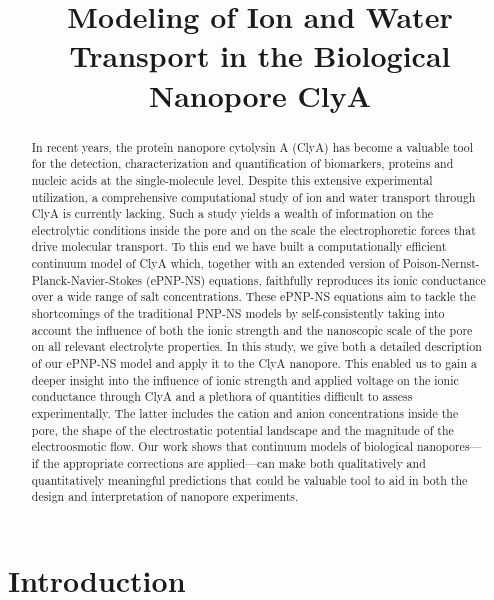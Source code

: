 \documentclass[journal=ancac3,manuscript=article,etalmode=truncate,maxauthors=0,layout=onecolumn]{achemso}
\title{Modeling of Ion and Water Transport in the Biological Nanopore ClyA}
\begin{document}
\begin{tocentry}
\end{tocentry}



\begin{abstract}
  \footnotesize
  In recent years, the protein nanopore cytolysin A (ClyA) has become a valuable tool for the detection,
  characterization and quantification of biomarkers, proteins and nucleic acids at the single-molecule level.
  Despite this extensive experimental utilization, a comprehensive computational study of ion and water
  transport through ClyA is currently lacking. Such a study yields a wealth of information on the electrolytic
  conditions inside the pore and on the scale the electrophoretic forces that drive molecular transport. To
  this end we have built a computationally efficient continuum model of ClyA which, together with an extended
  version of Poison-Nernst-Planck-Navier-Stokes (ePNP-NS) equations, faithfully reproduces its ionic
  conductance over a wide range of salt concentrations. These ePNP-NS equations aim to tackle the shortcomings
  of the traditional PNP-NS models by self-consistently taking into account the influence of both the ionic
  strength and the nanoscopic scale of the pore on all relevant electrolyte properties. In this study, we give
  both a detailed description of our ePNP-NS model and apply it to the ClyA nanopore. This enabled us to gain
  a deeper insight into the influence of ionic strength and applied voltage on the ionic conductance through
  ClyA and a plethora of quantities difficult to assess experimentally. The latter includes the cation and
  anion concentrations inside the pore, the shape of the electrostatic potential landscape and the magnitude
  of the electroosmotic flow. Our work shows that continuum models of biological nanopores---if the
  appropriate corrections are applied---can make both qualitatively and quantitatively meaningful predictions
  that could be valuable tool to aid in both the design and interpretation of nanopore experiments.
\end{abstract}


\section{Introduction}
\end{document}
